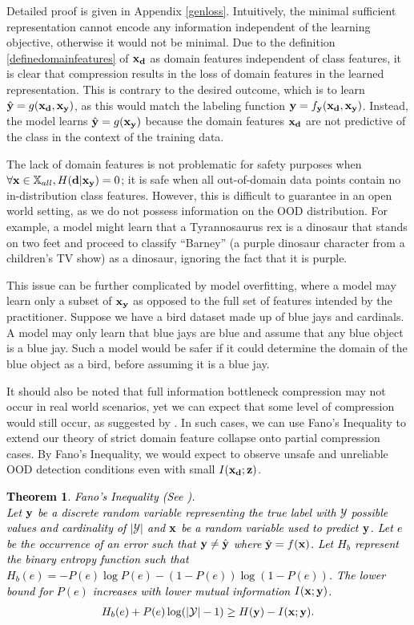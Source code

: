 \documentclass[letterpaper]{article} %
\theoremstyle{plain}
\newtheorem{theorem}{Theorem}[section]
\theoremstyle{definition}
\theoremstyle{remark}
\begin{document}
    Detailed proof is given in Appendix \ref{genloss}. Intuitively, the minimal sufficient representation cannot encode any information independent of the learning objective, otherwise it would not be minimal. Due to the definition \ref{definedomainfeatures} of ${\mathbf{x}}_{\mathbf{d}}$ as domain features independent of class features, it is clear that compression results in the loss of domain features in the learned representation. This is contrary to the desired outcome, which is to learn $\hat{{\mathbf{y}}} = g({\mathbf{x}}_{\mathbf{d}}, {\mathbf{x}}_{\mathbf{y}})$, as this would match the labeling function ${\mathbf{y}} = f_{\mathbf{y}}({\mathbf{x}}_{\mathbf{d}}, {\mathbf{x}}_{\mathbf{y}})$. Instead, the model learns $\hat{{\mathbf{y}}} = g({\mathbf{x}}_{\mathbf{y}})$ because the domain features ${\mathbf{x}}_{\mathbf{d}}$ are not predictive of the class in the context of the training data. 

The lack of domain features is not problematic for safety purposes when $\forall {\mathbf{x}} \in {\mathbb{X}}_{all}, H({\mathbf{d}}|{\mathbf{x}}_{\mathbf{y}}) = 0$; it is safe when all out-of-domain data points contain no in-distribution class features.  However, this is difficult to guarantee in an open world setting, as we do not possess information on the OOD distribution. For example, a model might learn that a Tyrannosaurus rex is a dinosaur that stands on two feet and proceed to classify ``Barney'' (a purple dinosaur character from a children's TV show) as a dinosaur, ignoring the fact that it is purple.

This issue can be further complicated by model overfitting, where a model may learn only a subset of ${\mathbf{x}}_{\mathbf{y}}$ as opposed to the full set of features intended by the practitioner. Suppose we have a bird dataset made up of blue jays and cardinals. A model may only learn that blue jays are blue and assume that any blue object is a blue jay. Such a model would be safer if it could determine the domain of the blue object as a bird, before assuming it is a blue jay.  

It should also be noted that full information bottleneck compression may not occur in real world scenarios, yet we can expect that some level of compression would still occur, as suggested by \cite{tishby2015deep}. In such cases, we can use Fano's Inequality to extend our theory of strict domain feature collapse onto partial compression cases. By Fano's Inequality, we would expect to observe unsafe and unreliable OOD detection conditions even with small $I({\mathbf{x}}_{\mathbf{d}}; {\mathbf{z}})$. 

\textcolor{black}{
\begin{theorem}
Fano's Inequality (See \citep{robert1952fano}). \\Let ${\mathbf{y}}$ be a discrete random variable representing the true label with $\mathcal{Y} $ possible values and cardinality of $|\mathcal{Y}| $ and ${\mathbf{x}}$ be a random variable used to predict ${\mathbf{y}}$. Let $e$ be the occurrence of an error such that ${\mathbf{y}} \neq \hat{ {\mathbf{y}}}$ where $\hat{ {\mathbf{y}}} = f({\mathbf{x}})$. Let $H_b$ represent the binary entropy function such that $H_b(e)=-P(e) \log P(e)-(1-P(e)) \log (1-P(e))$. The lower bound for $P(e)$ increases with lower mutual information $I({\mathbf{x}};{\mathbf{y}})$. 
\begin{align}
H_b(e) + P(e) \log(| \mathcal{Y} |-1) \geq H({\mathbf{y}}) - I({\mathbf{x}}; {\mathbf{y}}).
\end{align}
\label{fano}
\end{theorem}}
\end{document}
